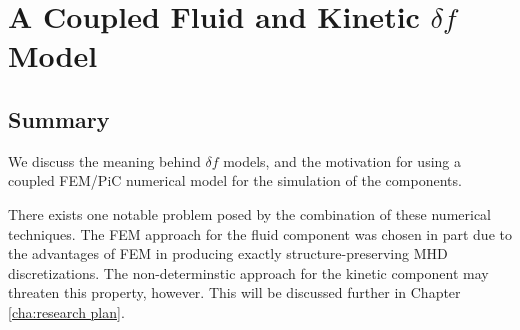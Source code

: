 \chapter{A Coupled Fluid and Kinetic $\delta\!f$ Model}\label{cha:delta f corrections}
    

    
    


    \section*{Summary}
        We discuss the meaning behind $\delta\!f$ models, and the motivation for using a coupled FEM/PiC numerical model for the simulation of the components.
        
        There exists one notable problem posed by the combination of these numerical techniques. The FEM approach for the fluid component was chosen in part due to the advantages of FEM in producing exactly structure-preserving MHD discretizations. The non-determinstic approach for the kinetic component may threaten this property, however. This will be discussed further in Chapter \ref{cha:research plan}.
    